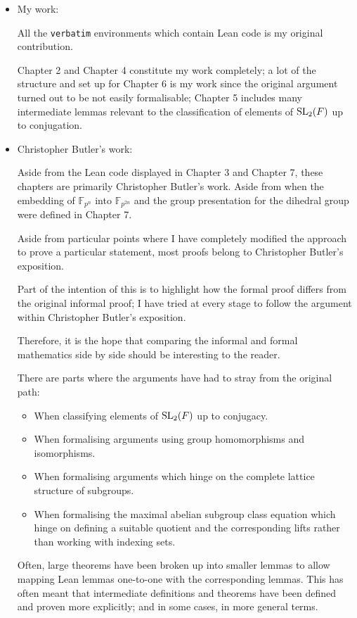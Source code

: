 \begin{itemize}
    \item My work:
    
    All the \texttt{verbatim} environments which contain Lean code is my original contribution.
    
    Chapter 2 and Chapter 4 constitute my work completely; a lot of the structure and set up for Chapter 6 is my work
    since the original argument turned out to be not easily formalisable; Chapter 5 includes many intermediate lemmas relevant
    to the classification of elements of $\operatorname{SL}_2(F)$ up to conjugation.


    \item Christopher Butler's work:
    
    Aside from the Lean code displayed in Chapter 3 and Chapter 7, these chapters are primarily Christopher Butler's work. Aside from
    when the embedding of $\mathbb{F}_{p^n}$ into $\mathbb{F}_{p^{2n}}$ and the group presentation for the dihedral group were defined 
    in Chapter 7.
    
    Aside from particular points where I have completely modified the approach to prove a particular statement, most proofs belong to Christopher Butler's exposition.
    
    Part of the intention of this is to highlight how the formal proof differs from the 
    original informal proof; I have tried at every stage to follow the argument within Christopher Butler's exposition. 
    
    Therefore, it is the hope that comparing the informal and formal mathematics side by side should be interesting to the reader.

    There are parts where the arguments have had to stray from the original path:
    
    \begin{itemize}
        \item When classifying elements of $\operatorname{SL}_2(F)$ up to conjugacy.
        \item When formalising arguments using group homomorphisms and isomorphisms.
        \item When formalising arguments which hinge on the complete lattice structure of subgroups.
        \item When formalising the maximal abelian subgroup class equation which hinge on defining
        a suitable quotient and the corresponding lifts rather than working with indexing sets.
    \end{itemize}
    
    Often, large theorems have been broken up into smaller lemmas to allow mapping Lean lemmas one-to-one with the corresponding lemmas. 
    This has often meant that intermediate definitions and theorems have been defined and proven more explicitly; and in some cases, 
    in more general terms.
\end{itemize}


